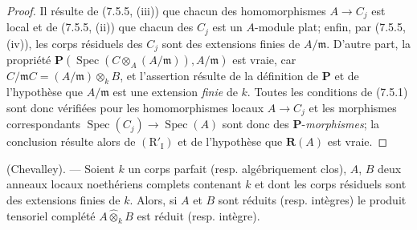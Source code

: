 \begin{proof}
Il résulte de (7.5.5, (iii)) que chacun des homomorphismes $A\to C_j$ est local
et de (7.5.5, (ii)) que chacun des $C_j$ est un $A$-module plat; enfin, par
(7.5.5, (iv)), les corps résiduels des $C_j$ sont des extensions finies de
$A/\mathfrak m$. D'autre part, la propriété
$\boldsymbol P(\operatorname{Spec}(C\otimes_A(A/\mathfrak m)),A/\mathfrak m)$
est vraie, car $C/\mathfrak mC=(A/\mathfrak m)\otimes_kB$, et l'assertion
résulte de la définition de $\boldsymbol P$ et de l'hypothèse que
$A/\mathfrak m$ est une extension \emph{finie} de $k$. Toutes les conditions de
(7.5.1) sont donc vérifiées pour les homomorphismes locaux $A\to C_j$ et les
morphismes correspondants
$\operatorname{Spec}(C_j)\to\operatorname{Spec}(A)$ sont donc des
$\boldsymbol P$-\emph{morphismes}; la conclusion résulte alors de
$(\mathrm R'_{\mathrm I})$ et de l'hypothèse que $\boldsymbol R(A)$ est vraie.
\end{proof}

\begin{corollary}[7.5.7]
\label{IV.2.s7.5.7-fr}
(Chevalley). --- Soient $k$ un corps parfait \textup{(resp.} algébriquement clos), $A$,
$B$ deux anneaux locaux noethériens complets contenant $k$ et dont les corps
résiduels sont des extensions finies de $k$. Alors, si $A$ et $B$ sont réduits
\textup{(resp.} intègres) le produit tensoriel complété $A\widehat\otimes_k B$ est
réduit \textup{(resp.} intègre).
\end{corollary}

